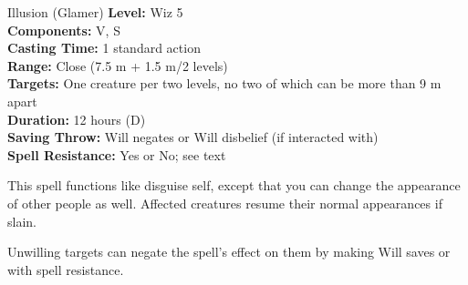 {Illusion (Glamer)}
{
	\textbf{Level:}
	Wiz 5\\
	\textbf{Components:}
	V, S\\
	\textbf{Casting Time:}
	1 standard action\\
	\textbf{Range:}
	Close (7.5 m + 1.5 m/2 levels)\\
	\textbf{Targets:}
	One creature per two levels, no two of which can be more than 9 m apart\\
	\textbf{Duration:}
	12 hours (D)\\
	\textbf{Saving Throw:}
	Will negates or Will disbelief (if interacted with)\\
	\textbf{Spell Resistance:}
	Yes or No; see text\\
}
{
	This spell functions like disguise self, except that you can change the appearance of other people as well. Affected creatures resume their normal appearances if slain.

	Unwilling targets can negate the spell's effect on them by making Will saves or with spell resistance.

}
